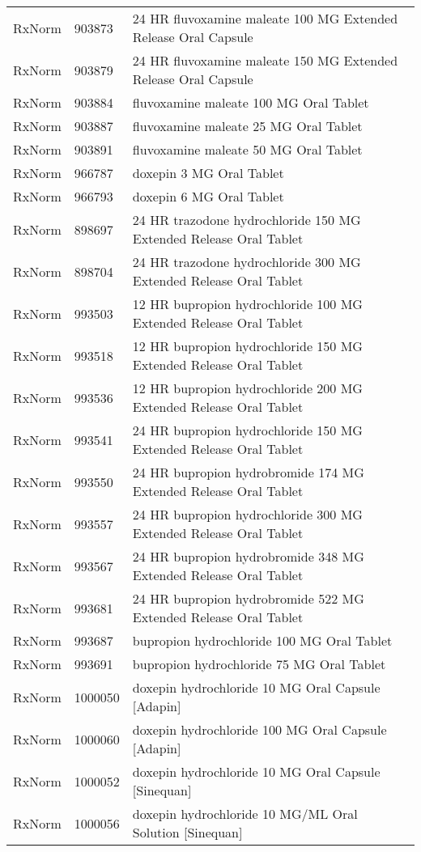 \begin{longtable}{p{}p{}p{}}
  RxNorm & 903873 & 24 HR fluvoxamine maleate 100 MG Extended Release Oral Capsule \\ 
  RxNorm & 903879 & 24 HR fluvoxamine maleate 150 MG Extended Release Oral Capsule \\ 
  RxNorm & 903884 & fluvoxamine maleate 100 MG Oral Tablet \\ 
  RxNorm & 903887 & fluvoxamine maleate 25 MG Oral Tablet \\ 
  RxNorm & 903891 & fluvoxamine maleate 50 MG Oral Tablet \\ 
  RxNorm & 966787 & doxepin 3 MG Oral Tablet \\ 
  RxNorm & 966793 & doxepin 6 MG Oral Tablet \\ 
  RxNorm & 898697 & 24 HR trazodone hydrochloride 150 MG Extended Release Oral Tablet \\ 
  RxNorm & 898704 & 24 HR trazodone hydrochloride 300 MG Extended Release Oral Tablet \\ 
  RxNorm & 993503 & 12 HR bupropion hydrochloride 100 MG Extended Release Oral Tablet \\ 
  RxNorm & 993518 & 12 HR bupropion hydrochloride 150 MG Extended Release Oral Tablet \\ 
  RxNorm & 993536 & 12 HR bupropion hydrochloride 200 MG Extended Release Oral Tablet \\ 
  RxNorm & 993541 & 24 HR bupropion hydrochloride 150 MG Extended Release Oral Tablet \\ 
  RxNorm & 993550 & 24 HR bupropion hydrobromide 174 MG Extended Release Oral Tablet \\ 
  RxNorm & 993557 & 24 HR bupropion hydrochloride 300 MG Extended Release Oral Tablet \\ 
  RxNorm & 993567 & 24 HR bupropion hydrobromide 348 MG Extended Release Oral Tablet \\ 
  RxNorm & 993681 & 24 HR bupropion hydrobromide 522 MG Extended Release Oral Tablet \\ 
  RxNorm & 993687 & bupropion hydrochloride 100 MG Oral Tablet \\ 
  RxNorm & 993691 & bupropion hydrochloride 75 MG Oral Tablet \\ 
  RxNorm & 1000050 & doxepin hydrochloride 10 MG Oral Capsule [Adapin] \\ 
  RxNorm & 1000060 & doxepin hydrochloride 100 MG Oral Capsule [Adapin] \\ 
  RxNorm & 1000052 & doxepin hydrochloride 10 MG Oral Capsule [Sinequan] \\ 
  RxNorm & 1000056 & doxepin hydrochloride 10 MG/ML Oral Solution [Sinequan] \\ 

\end{longtable}

